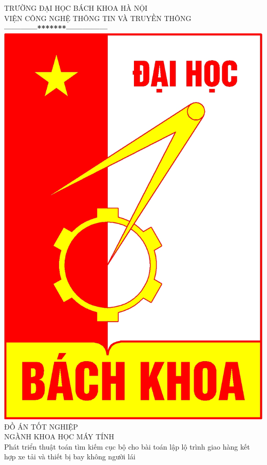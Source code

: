 \documentclass[a4paper,12pt]{report}
\begin{document}
\thispagestyle{empty}
\thisfancypage{
\setlength{\fboxrule}{1pt}
\doublebox}{}

\begin{center}
{\fontsize{16}{19}\selectfont TRƯỜNG ĐẠI HỌC BÁCH KHOA HÀ NỘI\\
VIỆN CÔNG NGHỆ THÔNG TIN VÀ TRUYỀN THÔNG}\\
\textbf{------------*******---------------}\\[1cm]
\includegraphics[scale=0.13]{hust.jpg}\\[1.3cm]
{\fontsize{23}{43}\selectfont ĐỒ ÁN TỐT NGHIỆP}\\[0.1cm]
{\fontsize{25}{10}\selectfont NGÀNH KHOA HỌC MÁY TÍNH}\\[0.9cm]
{\fontsize{20}{24}\selectfont Phát triển thuật toán tìm kiếm cục bộ cho bài toán lập lộ trình giao hàng kết hợp xe tải và thiết bị bay không người lái}\\[0.3cm]

\end{center}
\end{document}
